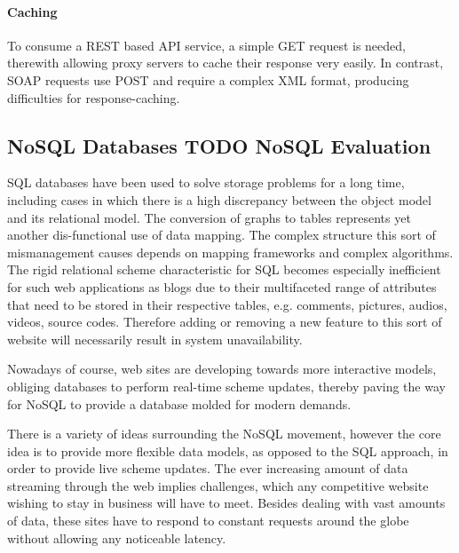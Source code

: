 \paragraph{Caching}

To consume a REST based API service, a simple GET request is needed, therewith allowing proxy servers to cache their response very easily. In contrast, SOAP requests use POST and require a complex XML format, producing difficulties for response-caching.

\subsection{NoSQL Databases TODO NoSQL Evaluation\label{sec:back_da_per}}
SQL databases have been used to solve storage problems for a long time, including cases in which there is a high discrepancy between the object model and its relational model. The conversion of graphs to tables represents yet another dis-functional use of data mapping. The complex structure this sort of mismanagement causes depends on mapping frameworks and complex algorithms. The rigid relational scheme characteristic for SQL becomes especially inefficient for such web applications as blogs due to their multifaceted range of attributes that need to be stored in their respective tables, e.g. comments, pictures, audios, videos, source codes. Therefore adding or removing a new feature to this sort of website will necessarily result in system unavailability.          

Nowadays of course,  web sites are developing towards more interactive models, obliging databases to perform real-time scheme updates, thereby paving the way for NoSQL to provide a database molded for modern demands. %


There is a variety of ideas surrounding the NoSQL movement, however the core idea is to provide more flexible data models, as opposed to the SQL approach, in order to provide live scheme updates. The ever increasing amount of data streaming through the web implies challenges, which any competitive website wishing to stay in business will have to meet. Besides dealing with vast amounts of data, these sites have to respond to constant requests around the globe without allowing any noticeable latency.

